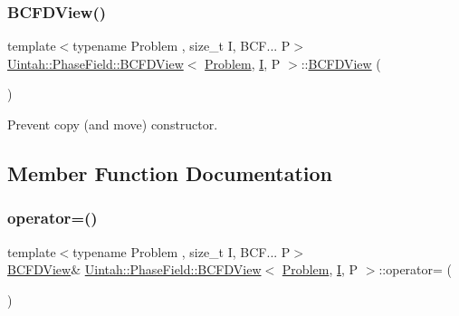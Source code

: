 \subsubsection{\texorpdfstring{B\+C\+F\+D\+View()}{BCFDView()}\hspace{0.1cm}{\footnotesize\ttfamily [3/3]}}
{\footnotesize\ttfamily template$<$typename Problem , size\+\_\+t I, B\+C\+F... P$>$ \\
\hyperlink{classUintah_1_1PhaseField_1_1BCFDView}{Uintah\+::\+Phase\+Field\+::\+B\+C\+F\+D\+View}$<$ \hyperlink{classUintah_1_1PhaseField_1_1Problem}{Problem}, \hyperlink{structUintah_1_1PhaseField_1_1I}{I}, P $>$\+::\hyperlink{classUintah_1_1PhaseField_1_1BCFDView}{B\+C\+F\+D\+View} (\begin{DoxyParamCaption}\item[{const \hyperlink{classUintah_1_1PhaseField_1_1BCFDView}{B\+C\+F\+D\+View}$<$ \hyperlink{classUintah_1_1PhaseField_1_1Problem}{Problem}, \hyperlink{structUintah_1_1PhaseField_1_1I}{I}, P $>$ \&}]{ }\end{DoxyParamCaption})\hspace{0.3cm}{\ttfamily [delete]}}



Prevent copy (and move) constructor. 



\subsection{Member Function Documentation}
\mbox{\label{classUintah_1_1PhaseField_1_1BCFDView_aaa28c532b707463797e7a498a3830a81}} 
\subsubsection{\texorpdfstring{operator=()}{operator=()}}
{\footnotesize\ttfamily template$<$typename Problem , size\+\_\+t I, B\+C\+F... P$>$ \\
\hyperlink{classUintah_1_1PhaseField_1_1BCFDView}{B\+C\+F\+D\+View}\& \hyperlink{classUintah_1_1PhaseField_1_1BCFDView}{Uintah\+::\+Phase\+Field\+::\+B\+C\+F\+D\+View}$<$ \hyperlink{classUintah_1_1PhaseField_1_1Problem}{Problem}, \hyperlink{structUintah_1_1PhaseField_1_1I}{I}, P $>$\+::operator= (\begin{DoxyParamCaption}\item[{const \hyperlink{classUintah_1_1PhaseField_1_1BCFDView}{B\+C\+F\+D\+View}$<$ \hyperlink{classUintah_1_1PhaseField_1_1Problem}{Problem}, \hyperlink{structUintah_1_1PhaseField_1_1I}{I}, P $>$ \&}]{ }\end{DoxyParamCaption})\hspace{0.3cm}{\ttfamily [delete]}}



